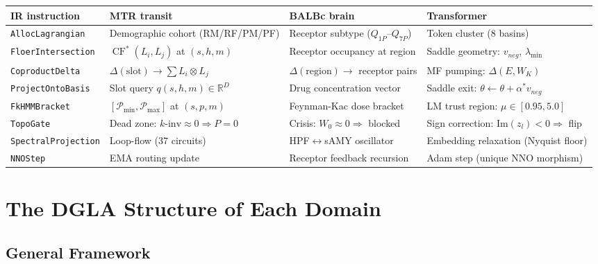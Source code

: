 \documentclass[11pt]{amsart}
\DeclareMathOperator{\CF}{CF}
\begin{document}
\begin{center}
\small
\begin{tabular}{p{3.0cm}p{3.2cm}p{3.2cm}p{3.2cm}}
\toprule
\textbf{IR instruction} & \textbf{MTR transit} & \textbf{BALBc brain} & \textbf{Transformer} \\
\midrule
\texttt{AllocLagrangian} &
  Demographic cohort (RM/RF/PM/PF) &
  Receptor subtype ($Q_{1P}$--$Q_{7P}$) &
  Token cluster (8 basins) \\
\texttt{FloerIntersection} &
  $\CF^*(L_i,L_j)$ at $(s,h,m)$ &
  Receptor occupancy at region &
  Saddle geometry: $v_{neg}$, $\lambda_{\min}$ \\
\texttt{CoproductDelta} &
  $\Delta(\text{slot}) \to \sum L_i \otimes L_j$ &
  $\Delta(\text{region}) \to$ receptor pairs &
  MF pumping: $\Delta(E,W_K)$ \\
\texttt{ProjectOntoBasis} &
  Slot query $q(s,h,m) \in \mathbb{R}^D$ &
  Drug concentration vector &
  Saddle exit: $\theta \leftarrow \theta + \alpha^* v_{neg}$ \\
\texttt{FkHMMBracket} &
  $[\mathcal{P}_{\min}, \mathcal{P}_{\max}]$ at $(s,p,m)$ &
  Feynman-Kac dose bracket &
  LM trust region: $\mu \in [0.95, 5.0]$ \\
\texttt{TopoGate} &
  Dead zone: $k\text{-inv} \approx 0 \Rightarrow P=0$ &
  Crisis: $W_0 \approx 0 \Rightarrow$ blocked &
  Sign correction: $\text{Im}(z_l) < 0 \Rightarrow$ flip \\
\texttt{SpectralProjection} &
  Loop-flow (37 circuits) &
  HPF$\leftrightarrow$sAMY oscillator &
  Embedding relaxation (Nyquist floor) \\
\texttt{NNOStep} &
  EMA routing update &
  Receptor feedback recursion &
  Adam step (unique NNO morphism) \\
\bottomrule
\end{tabular}
\end{center}

\section{The DGLA Structure of Each Domain}

\subsection{General Framework}
\end{document}
